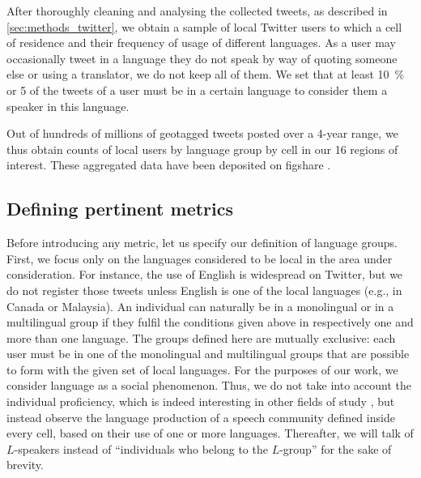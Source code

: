 \documentclass[../thesis.tex]{subfiles}
\begin{document}
After thoroughly cleaning and analysing the collected tweets, as described in
\cref{sec:methods_twitter}, we obtain a sample of local Twitter users to which a cell
of residence and their frequency of usage of different languages. As a user may
occasionally tweet in a language they do not speak by way of quoting someone else or
using a translator, we do not keep all of them. We set that at least \SI{10}{\percent}
or 5 of the tweets of a user must be in a certain language to consider them a speaker in
this language. 

Out of hundreds of millions of geotagged tweets posted over a 4-year range, we thus
obtain counts of local users by language group by cell in our 16 regions of interest.
These aggregated data have been deposited on figshare
\cite{LoufSpatialDistributions2021}.



\subsection{Defining pertinent metrics}
Before introducing any metric, let us specify our definition of language groups. First,
we focus only on the languages considered to be local in the area under consideration.
For instance, the use of English is widespread on Twitter, but we do not register those
tweets unless English is one of the local languages (e.g., in Canada or Malaysia). An individual can naturally be in a monolingual or
in a multilingual group if they fulfil the conditions given above in respectively one and more than
one language. The groups defined here are mutually exclusive: each user must be in one
of the monolingual and multilingual groups that are possible to form with the given set
of local languages. For the purposes of our work, we consider language as a social
phenomenon. Thus, we do not take into account the individual proficiency, which is
indeed interesting in other fields of study \cite{BakerFoundationsBilingual1997}, but
instead observe the language production of a speech community defined inside every cell,
based on their use of one or more languages. Thereafter, we will talk of $L$-speakers
instead of ``individuals who belong to the $L$-group'' for the sake of brevity.
\end{document}
